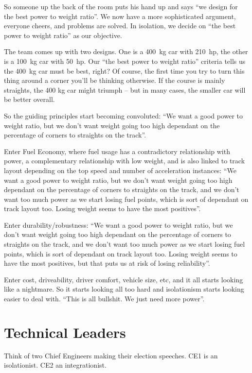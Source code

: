\documentclass[10pt, a4paper, article, oneside, twocolumn, final]{memoir}
\begin{document}
So someone up the back of the room puts his hand up and says “we design for the best power to weight ratio”. We now have a more sophisticated argument, everyone cheers, and problems are solved. In isolation, we decide on “the best power to weight ratio” as our objective. 

The team comes up with two designs. One is a \SI{400}{\kilogram} car with \SI{210}{hp}, the other is a \SI{100}{\kilogram} car with \SI{50}{hp}. Our “the best power to weight ratio” criteria tells us the \SI{400}{\kilogram} car must be best, right? Of course, the first time you try to turn this thing around a corner you’ll be thinking otherwise. If the course is mainly straights, the 400 kg car might triumph -- but in many cases, the smaller car will be better overall. 

So the guiding principles start becoming convoluted: “We want a good power to weight ratio, but we don’t want weight going too high dependant on the percentage of corners to straights on the track”.

Enter Fuel Economy, where fuel usage has a contradictory relationship with power, a complementary relationship with low weight, and is also linked to track layout depending on the top speed and number of acceleration instances: “We want a good power to weight ratio, but we don’t want weight going too high dependant on the percentage of corners to straights on the track, and we don’t want too much power as we start losing fuel points, which is sort of dependant on track layout too. Losing weight seems to have the most positives”.

Enter durability/\allowbreak robustness: “We want a good power to weight ratio, but we don’t want weight going too high dependant on the percentage of corners to straights on the track, and we don’t want too much power as we start losing fuel points, which is sort of dependant on track layout too. Losing weight seems to have the most positives, but that puts us at risk of losing reliability”.

Enter cost, driveability, driver comfort, vehicle size, etc, and it all starts looking like a nightmare. So it starts looking all too hard and isolationism starts looking easier to deal with. “This is all bullshit. We just need more power”. 

\section*{Technical Leaders}

Think of two Chief Engineers making their election speeches. CE1 is an isolationist. CE2 an integrationist.
\end{document}
